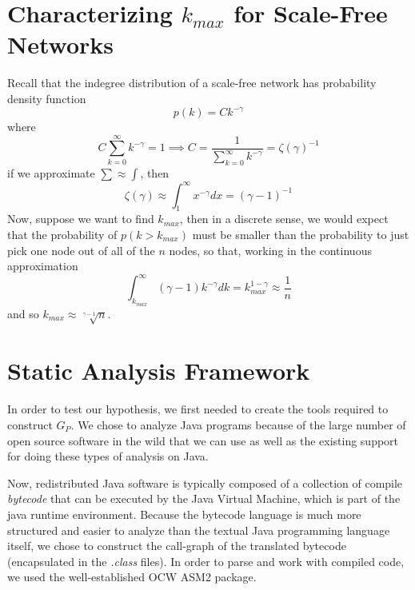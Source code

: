 \documentclass[11pt,a4paper]{article}
\newcommand{\pa}[1]{\left(#1\right)}
\begin{document}
\section*{Characterizing $k_{max}$ for Scale-Free Networks}
Recall that the indegree distribution of a scale-free network has probability 
density function
$$
p(k) = C k^{-\gamma}
$$
where 
$$
C \sum_{k=0}^\infty k^{-\gamma} = 1 \implies 
C = \frac{1}{\sum\limits_{k=0}^\infty k^{-\gamma}} = \zeta(\gamma)^{-1}
$$
if we approximate $\sum \approx \int$, then
$$
\zeta(\gamma) \approx \int_1^\infty x^{-\gamma} dx = \pa{\gamma-1}^{-1}
$$
Now, suppose we want to find $k_{max}$, then in a discrete sense, we would 
expect that the probability of $p(k > k_{max})$ must be smaller than the 
probability to just pick one node out of all of the $n$ nodes, so that, 
working in the continuous approximation
$$
\int_{k_{max}}^\infty (\gamma -1)k^{-\gamma} dk = k_{max}^{1-\gamma} \approx 
\frac{1}{n}
$$
and so $k_{max} \approx \sqrt[\gamma - 1]{n}$. \cite{CLASS}

\section*{Static Analysis Framework}
In order to test our hypothesis, we first needed to create the tools required 
to construct $G_P$. We chose to analyze Java programs because of the large 
number of open source software in the wild that we can use as well as the 
existing support for doing these types of analysis on Java. 

Now, redistributed Java software is typically composed of a collection of 
compile \emph{bytecode} that can be executed by the Java Virtual Machine, 
which is part of the java runtime environment. Because the bytecode language 
is much more structured and easier to analyze than the textual Java 
programming language itself, we chose to construct the call-graph of the 
translated bytecode (encapsulated in the \emph{.class} files). In order to 
parse and work with compiled code, we used the well-established OCW ASM2 
package. \cite{ocwasm} 
\end{document}
